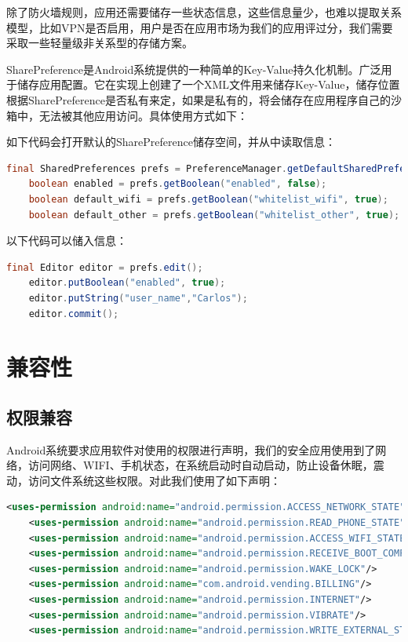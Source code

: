 \documentclass[format=final, language=chinese, degree=fyp]{hustthesis}
\begin{document}
除了防火墙规则，应用还需要储存一些状态信息，这些信息量少，也难以提取关系模型，比如VPN是否启用，用户是否在应用市场为我们的应用评过分，我们需要采取一些轻量级非关系型的存储方案。

SharePreference是Android系统提供的一种简单的Key-Value持久化机制。广泛用于储存应用配置。它在实现上创建了一个XML文件用来储存Key-Value，储存位置根据SharePreference是否私有来定，如果是私有的，将会储存在应用程序自己的沙箱中，无法被其他应用访问。具体使用方式如下：

如下代码会打开默认的SharePreference储存空间，并从中读取信息：

\begin{lstlisting}[language=java]
    final SharedPreferences prefs = PreferenceManager.getDefaultSharedPreferences(this);
    boolean enabled = prefs.getBoolean("enabled", false);
    boolean default_wifi = prefs.getBoolean("whitelist_wifi", true);
    boolean default_other = prefs.getBoolean("whitelist_other", true);
\end{lstlisting}

以下代码可以储入信息：

\begin{lstlisting}[language=java]
    final Editor editor = prefs.edit();
    editor.putBoolean("enabled", true);
    editor.putString("user_name","Carlos");
    editor.commit();
\end{lstlisting}

\section{兼容性}

\subsection{权限兼容}
Android系统要求应用软件对使用的权限进行声明，我们的安全应用使用到了网络，访问网络、WIFI、手机状态，在系统启动时自动启动，防止设备休眠，震动，访问文件系统这些权限。对此我们使用了如下声明：

\begin{lstlisting}[language=xml]
    <uses-permission android:name="android.permission.ACCESS_NETWORK_STATE"/>
    <uses-permission android:name="android.permission.READ_PHONE_STATE"/>
    <uses-permission android:name="android.permission.ACCESS_WIFI_STATE"/>
    <uses-permission android:name="android.permission.RECEIVE_BOOT_COMPLETED"/>
    <uses-permission android:name="android.permission.WAKE_LOCK"/>
    <uses-permission android:name="com.android.vending.BILLING"/>
    <uses-permission android:name="android.permission.INTERNET"/>
    <uses-permission android:name="android.permission.VIBRATE"/>
    <uses-permission android:name="android.permission.WRITE_EXTERNAL_STORAGE" />
\end{lstlisting}
\end{document}

